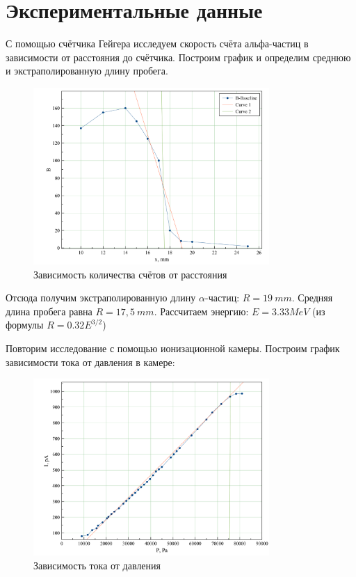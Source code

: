 \documentclass[a4paper,12pt]{article}
\begin{document}
	    
	\section{Экспериментальные данные}
		С помощью счётчика Гейгера исследуем скорость счёта альфа-частиц в зависимости от расстояния до счётчика. Построим график и определим среднюю и экстраполированную длину пробега.
		\begin{figure}[h!]
        \centering
        \includegraphics[width=0.8\textwidth]{geig}
        \caption{Зависимость количества счётов от расстояния}
    \end{figure}
    
    Отсюда получим экстраполированную длину $\alpha$-частиц: $R = 19 ~mm$. Средняя длина пробега равна $R = 17,5 ~mm$.
    Рассчитаем энергию: $E = 3.33 MeV$ (из формулы $R=0.32E^{3/2}$)
    
        Повторим исследование с помощью ионизационной камеры. Построим график зависимости тока от давления в камере:
        \pagebreak
        \begin{figure}[h!]
        \centering
        \includegraphics[width=0.8\textwidth]{nasos}
        \caption{Зависимость тока от давления }
    \end{figure}
    
\end{document}
